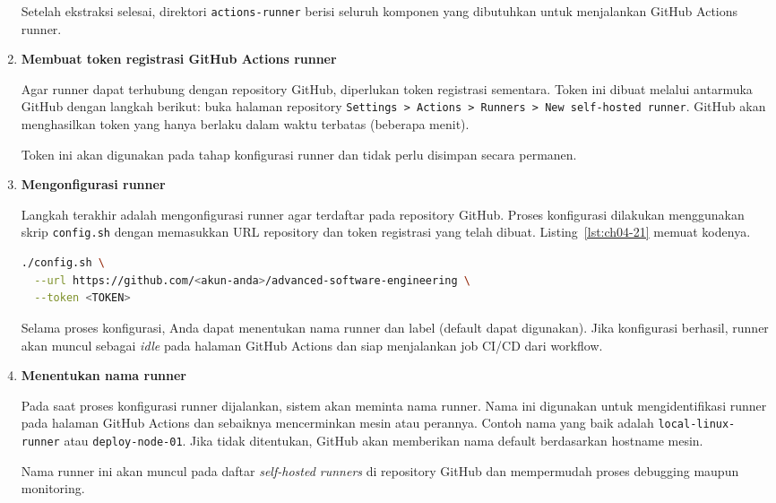 \begin{enumerate}
Setelah ekstraksi selesai, direktori \texttt{actions-runner} berisi seluruh
komponen yang dibutuhkan untuk menjalankan GitHub Actions runner.

\item \textbf{Membuat token registrasi GitHub Actions runner}

Agar runner dapat terhubung dengan repository GitHub, diperlukan token
registrasi sementara. Token ini dibuat melalui antarmuka GitHub dengan
langkah berikut: buka halaman repository
\texttt{Settings > Actions > Runners > New self-hosted runner}.
GitHub akan menghasilkan token yang hanya berlaku dalam waktu terbatas
(beberapa menit).

Token ini akan digunakan pada tahap konfigurasi runner dan tidak perlu
disimpan secara permanen.

\item \textbf{Mengonfigurasi runner}

Langkah terakhir adalah mengonfigurasi runner agar terdaftar pada repository
GitHub. Proses konfigurasi dilakukan menggunakan skrip \texttt{config.sh}
dengan memasukkan URL repository dan token registrasi yang telah dibuat. Listing~\ref{lst:ch04-21} memuat kodenya.

\begin{lstlisting}[language=bash, caption={Potongan kode pada Tutorial (2)}, label={lst:ch04-21}]
./config.sh \
  --url https://github.com/<akun-anda>/advanced-software-engineering \
  --token <TOKEN>
\end{lstlisting}

Selama proses konfigurasi, Anda dapat menentukan nama runner dan label
(default dapat digunakan). Jika konfigurasi berhasil, runner akan muncul
sebagai \textit{idle} pada halaman GitHub Actions dan siap menjalankan job
CI/CD dari workflow.


\item \textbf{Menentukan nama runner}

Pada saat proses konfigurasi runner dijalankan, sistem akan meminta nama
runner. Nama ini digunakan untuk mengidentifikasi runner pada halaman
GitHub Actions dan sebaiknya mencerminkan mesin atau perannya. Contoh nama
yang baik adalah \texttt{local-linux-runner} atau \texttt{deploy-node-01}.
Jika tidak ditentukan, GitHub akan memberikan nama default berdasarkan
hostname mesin.

Nama runner ini akan muncul pada daftar \textit{self-hosted runners}
di repository GitHub dan mempermudah proses debugging maupun monitoring.


\end{enumerate}

